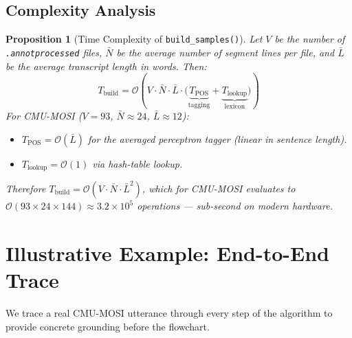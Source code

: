 \documentclass[12pt,a4paper]{article}
\theoremstyle{plain}
\newtheorem{proposition}[theorem]{Proposition}
\theoremstyle{definition}
\begin{document}
\subsection{Complexity Analysis}

\begin{proposition}[Time Complexity of \texttt{build\_samples()}]
\label{prop:complexity}
  Let $V$ be the number of \texttt{.annotprocessed} files,
  $\bar{N}$ be the average number of segment lines per file,
  and $\bar{L}$ be the average transcript length in words.
  Then:
  \[
    T_{\text{build}} = \mathcal{O}\!\left(
      V \cdot \bar{N} \cdot \bar{L} \cdot
      \bigl(\underbrace{T_{\text{POS}}}_{\text{tagging}}
      + \underbrace{T_{\text{lookup}}}_{\text{lexicon}}\bigr)
    \right)
  \]
  For CMU-MOSI ($V = 93$, $\bar{N} \approx 24$, $\bar{L} \approx 12$):
  \begin{itemize}
    \item $T_{\text{POS}} = \mathcal{O}(\bar{L})$ for the averaged
          perceptron tagger (linear in sentence length).
    \item $T_{\text{lookup}} = \mathcal{O}(1)$ via hash-table lookup.
  \end{itemize}
  Therefore $T_{\text{build}} = \mathcal{O}(V \cdot \bar{N} \cdot
  \bar{L}^2)$, which for CMU-MOSI evaluates to
  $\mathcal{O}(93 \times 24 \times 144) \approx 3.2 \times 10^5$
  operations — sub-second on modern hardware.
\end{proposition}

\section{Illustrative Example: End-to-End Trace}
\label{sec:example}

We trace a real CMU-MOSI utterance through every step of the algorithm
to provide concrete grounding before the flowchart.
\end{document}
